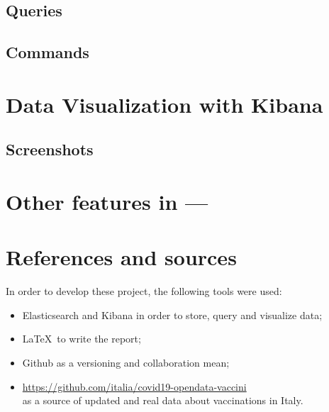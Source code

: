 \documentclass[12pt, a4paper]{article}
\begin{document}
\subsection{Queries}

\blindtext

\subsection{Commands}

\blindtext

\clearpage

\section{Data Visualization with Kibana}

\blindtext

\subsection{Screenshots}

\blindtext

\clearpage

\section{Other features in ---} 

\blindtext

\clearpage

\section{References and sources}

In order to develop these project, the following tools were used:

\begin{itemize}
    \item Elasticsearch and Kibana in order to store, query and visualize data;
    \item \LaTeX~to write the report;
    \item Github as a versioning and collaboration mean;
    \item \url{https://github.com/italia/covid19-opendata-vaccini} \\
        as a source of updated and real data about vaccinations in Italy.
\end{itemize}

\clearpage
\end{document}
